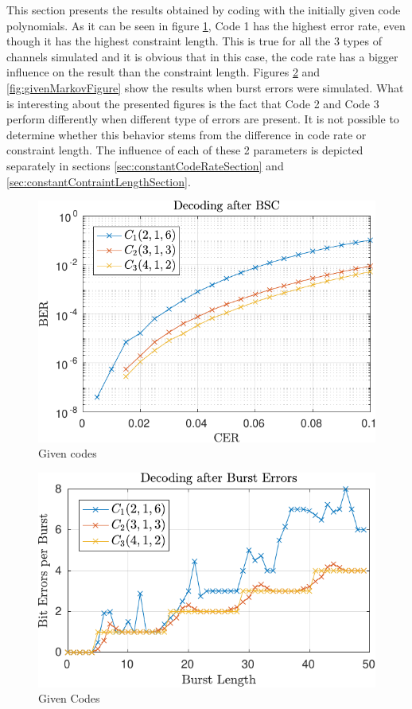 This section presents the results obtained by coding with the initially given code polynomials. As it can be seen in figure \ref{fig:givenRandomFigure}, Code 1 has the highest error rate, even though it has the highest constraint length. This is true for all the 3 types of channels simulated and it is obvious that in this case, the code rate has a bigger influence on the result than the constraint length. Figures \ref{fig:givenBurstFigure} and \ref{fig:givenMarkovFigure} show the results when burst errors were simulated. What is interesting about the presented figures is the fact that Code 2 and Code 3 perform differently when different type of errors are present. It is not possible to determine whether this behavior stems from the difference in code rate or constraint length. The influence of each of these 2 parameters is depicted separately in sections \ref{sec:constantCodeRateSection} and \ref{sec:constantContraintLengthSection}.

\begin{figure}
\centering
\includegraphics[scale=1]{../figures/qirandom.pdf} 
\caption{Given codes\label{fig:givenRandomFigure}}
\end{figure}

\begin{figure}
\centering
\includegraphics[scale=1]{../figures/qiburst.pdf} 
\caption{Given Codes\label{fig:givenBurstFigure}}
\end{figure}

